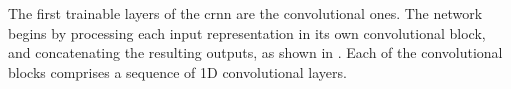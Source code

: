 
The first trainable layers of the \gls{crnn} are the
convolutional ones. The network begins by processing each
input representation in its own convolutional block, and
concatenating the resulting outputs, as shown in
. Each of the convolutional
blocks comprises a sequence of 1D convolutional layers.

